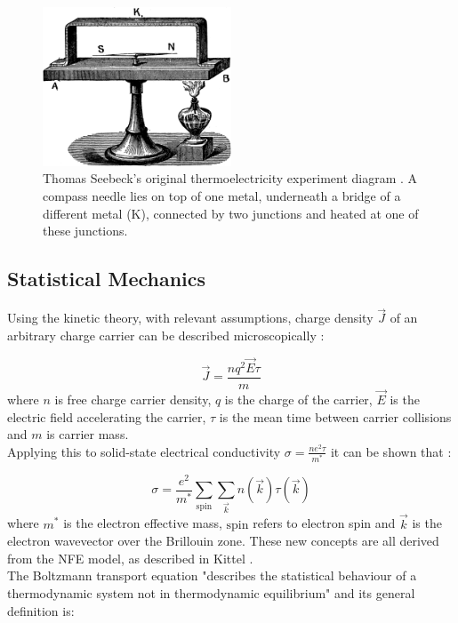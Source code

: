\documentclass[a4paper,10pt,journal]{IEEEtran}
\begin{document}
\begin{figure}
	\centering
	\includegraphics[width=0.5\textwidth]{seebeck-experiment-black.png}
	\caption{Thomas Seebeck's original thermoelectricity experiment
	diagram \cite{seebeck-original}. A compass needle lies on top of
	one metal, underneath a bridge of a different metal (K), connected
	by two junctions and heated at one of these junctions.}
	\label{seebeck-experiment}
\end{figure}

\subsection{Statistical Mechanics}
Using the kinetic theory, with relevant assumptions, charge density
$\vec{J}$ of an arbitrary charge carrier can be described
microscopically \cite{kittel}:

\begin{equation}
\label{charge-density}
	\vec{J} = \frac{nq^2\vec{E} \tau}{m}
\end{equation}
where $n$ is free charge carrier density, $q$ is the charge of the
carrier, $\vec{E}$ is the electric field accelerating the
carrier, $\tau$ is the mean time between carrier collisions and $m$ is
carrier mass.\\
Applying this to solid-state electrical conductivity $\sigma = \frac{ne^2
\tau}{m^*}$ it can be shown that \cite{ziman}:

\begin{equation}
\label{micro-elec}
	\sigma = \frac{e^2}{m^*} \sum_{\mathrm{spin}} \sum_{\vec{k}}
	n(\vec{k}) \tau(\vec{k})
\end{equation}
where $m^*$ is the electron effective mass, $\mathrm{spin}$ refers to
electron spin and $\vec{k}$ is the electron wavevector over the
Brillouin zone. These new concepts are all derived from the \ac{NFE}
model, as described in Kittel \cite{kittel}.\\
The Boltzmann transport equation "describes the statistical behaviour
of a thermodynamic system not in thermodynamic equilibrium"
\cite{wiki-boltz} and its general definition is:
\end{document}

